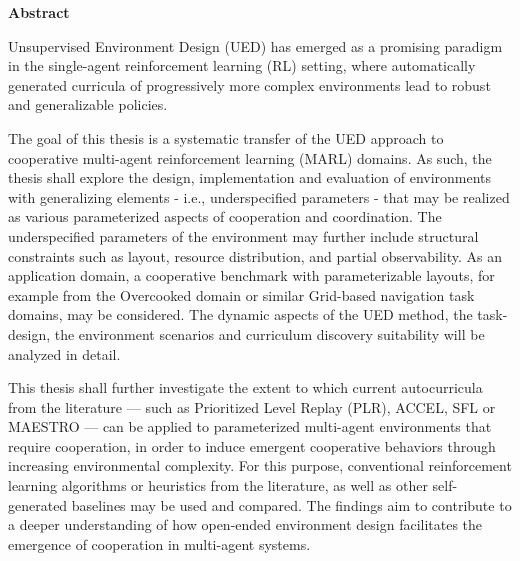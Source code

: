 %
%
\vspace*{2cm}

\begin{center}
    \textbf{Abstract}
\end{center}

\vspace*{1cm}

\noindent Unsupervised Environment Design (UED) has emerged as a promising paradigm in the single-agent reinforcement learning (RL) setting, where automatically generated curricula of progressively more complex environments lead to robust and generalizable policies.

The goal of this thesis is a systematic transfer of the UED approach to cooperative multi-agent reinforcement learning (MARL) domains. As such, the thesis shall explore the design, implementation and evaluation of environments with generalizing elements - i.e., underspecified parameters - that may be realized as various parameterized aspects of cooperation and coordination. The underspecified parameters of the environment may further include structural constraints such as layout, resource distribution, and partial observability. As an application domain, a cooperative benchmark with parameterizable layouts, for example from the Overcooked domain or similar Grid-based navigation task domains, may be considered. The dynamic aspects of the UED method, the task-design, the environment scenarios and curriculum discovery suitability will be analyzed in detail.

This thesis shall further investigate the extent to which current autocurricula from the literature — such as Prioritized Level Replay (PLR), ACCEL, SFL or MAESTRO — can be applied to parameterized multi-agent environments that require cooperation, in order to induce emergent cooperative behaviors through increasing environmental complexity. For this purpose, conventional reinforcement learning algorithms or heuristics from the literature, as well as other self-generated baselines may be used and compared. The findings aim to contribute to a deeper understanding of how open-ended environment design facilitates the emergence of cooperation in multi-agent systems.